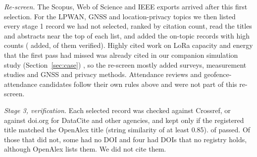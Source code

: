 \documentclass[preprint,12pt]{elsarticle}
\begin{document}
\emph{Re-screen.} The Scopus, Web of Science and IEEE exports arrived after this first selection. For the LPWAN, GNSS and location-privacy topics we then listed every stage 1 record we had not selected, ranked by citation count, read the titles and abstracts near the top of each list, and added the on-topic records with high counts (\nRescreen{} added, \nRescreenVer{} of them verified). Highly cited work on LoRa capacity and energy that the first pass had missed was already cited in our companion simulation study (Section~\ref{sec:case}) \cite{bor2016scale,georgiou2017scale,casals2017energy}, so the re-screen mostly added surveys, measurement studies and GNSS and privacy methods. Attendance reviews and geofence-attendance candidates follow their own rules above and were not part of this re-screen.

\emph{Stage 3, verification.} Each selected record was checked against Crossref, or against doi.org for DataCite and other agencies, and kept only if the registered title matched the OpenAlex title (string similarity of at least 0.85). \nVerified{} of \nSelected{} passed. Of those that did not, some had no DOI and four had DOIs that no registry holds, although OpenAlex lists them. We did not cite them.
\end{document}
